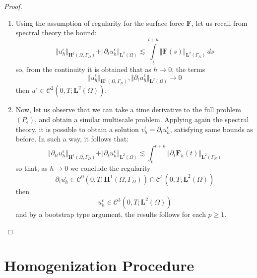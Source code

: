 \begin{proof}
\begin{enumerate}
    
    \item Using the assumption of regularity for the surface force $\mathbf{F}$, let us recall from spectral theory the bound:
    \begin{equation*}
        \Vert u_h^{\epsilon} \Vert_{\mathbf{H}^1(\Omega, \Gamma_D)} + \Vert \partial_t u_h^{\epsilon}\Vert_{\mathbf{L}^2(\Omega)} \lesssim \int \limits_t^{t+h} \Vert \mathbf{F}(s) \Vert_{\mathbf{L}^2(\Gamma_N)} \, ds
    \end{equation*}
    so, from the continuity it is obtained that as $h \rightarrow 0$, the terms 
    \begin{equation*}
        \Vert u_h^{\epsilon} \Vert_{\mathbf{H}^1(\Omega, \Gamma_D)}, \Vert \partial_t u_h^{\epsilon} \Vert_{\mathbf{L}^2 (\Omega)} \rightarrow 0
    \end{equation*}
    then $u^{\epsilon} \in \mathcal{C}^2(0,T; \mathbf{L}^2(\Omega))$.
    
    
    \item Now, let us observe that we can take a time derivative to the full problem $(P_{\epsilon})$, and obtain a similar multiscale problem. Applying again the spectral theory, it is possible to obtain a solution $v_h^{\epsilon} = \partial_t u_h^{\epsilon}$, satisfying same bounds as before. In such a way, it follows that:
    \begin{equation*}
        \Vert \partial_{tt} u_h^{\epsilon} \Vert_{\mathbf{H}^1(\Omega, \Gamma_D)} + \Vert \partial_t u_h^{\epsilon} \Vert_{\mathbf{L}^2 (\Omega)} \lesssim \int_t^{t+h} \Vert \partial_t \mathbf{F}_h(t) \Vert_{\mathbf{L}^2(\Gamma_N)}
    \end{equation*}
    so that, as $h \rightarrow 0$ we conclude the regularity
    \begin{equation*}
        \partial_t u_h^{\epsilon} \in \mathcal{C}^0(0,T;\mathbf{H}^1(\Omega, \Gamma_D)) \cap \mathcal{C}^1(0,T;\mathbf{L}^2(\Omega)) 
    \end{equation*}
    then
    \begin{equation*}
        u_h^{\epsilon} \in \mathcal{C}^3(0,T; \mathbf{L}^2(\Omega))
    \end{equation*}
    and by a bootstrap type argument, the results follows for each $p \geq 1$.
\end{enumerate}

\end{proof}



\section{Homogenization Procedure}

